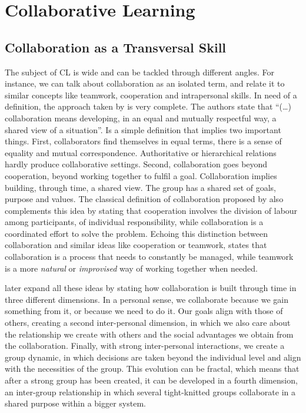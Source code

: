 \section{Collaborative Learning \label{sec:2-1}}
\subsection{Collaboration as a Transversal Skill \label{sec:2-1-1}}

The subject of \ac{CL} is wide and can be tackled through different angles. For instance, we can talk about collaboration as an isolated term, and relate it to similar concepts like teamwork,
cooperation and intrapersonal skills. In need of a definition, the approach taken by \textcite{andriessen_2020} is very complete. The authors state that ``(…) collaboration means developing, in
an equal and mutually respectful way, a shared view of a situation”. Is a simple definition that implies two important things. First, collaborators find themselves in equal terms, there is a
sense of equality and mutual correspondence. Authoritative or hierarchical relations hardly produce collaborative settings. Second, collaboration goes beyond cooperation, beyond working together
to fulfil a goal. Collaboration implies building, through time, a shared view. The group has a shared set of goals, purpose and values. The classical definition of collaboration proposed by
\textcite{omalley_1995} also complements this idea by stating that cooperation involves the division of labour among participants, of individual responsibility, while collaboration is a
coordinated effort to solve the problem. Echoing this distinction between collaboration and similar ideas like cooperation or teamwork, \textcite{salmons_2019} states that collaboration is a
process that needs to constantly be managed, while teamwork is a more \emph{natural} or \emph{improvised} way of working together when needed.

\textcite{andriessen_2020} later expand all these ideas by stating how collaboration is built through time in three different dimensions. In a personal sense, we collaborate because we gain
something from it, or because we need to do it. Our goals align with those of others, creating a second inter-personal dimension, in which we also care about the relationship we
create with others and the social advantages we obtain from the collaboration. Finally, with strong inter-personal interactions, we create a group dynamic, in which decisions are
taken beyond the individual level and align with the necessities of the group. This evolution can be fractal, which means that after a strong group has been created, it can be
developed in a fourth dimension, an inter-group relationship in which several tight-knitted groups collaborate in a shared purpose within a bigger system.

